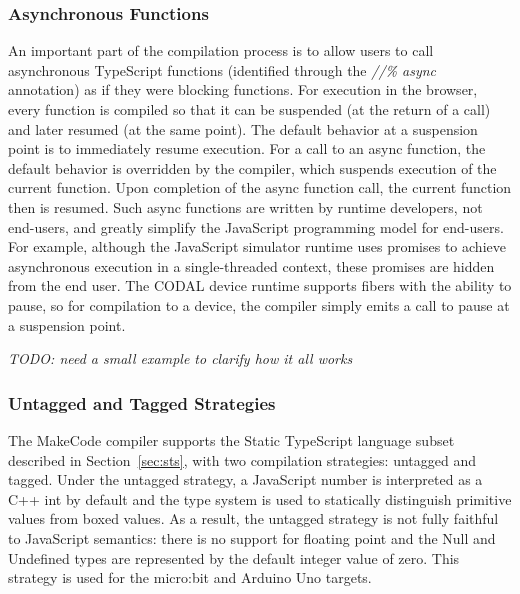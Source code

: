 \subsubsection{Asynchronous Functions}

An important part of the compilation process is to allow users to call asynchronous 
TypeScript functions (identified through the \emph{//\% async} annotation) 
as if they were blocking functions.  
For execution in the browser,
every function is compiled so that it can be suspended (at the return of a call) and later resumed (at the same point). 
The default behavior at a suspension point is to immediately resume execution.  For a call to an async function,
the default behavior is overridden by the compiler, which suspends execution of the current function. 
Upon completion of the async function call, the current function then is resumed. Such async functions are written
by runtime developers, not end-users, and greatly simplify the JavaScript
programming model for end-users. For example, although the JavaScript simulator runtime uses promises to 
achieve asynchronous execution in a single-threaded context, these promises are hidden from the end user. 
The CODAL device runtime supports fibers with the ability to pause, so for compilation to a device, 
the compiler simply emits a call to pause at a suspension point. 

\emph{TODO: need a small example to clarify how it all works}


\subsubsection{Untagged and Tagged Strategies}

The MakeCode compiler supports the Static TypeScript language subset described in Section~\ref{sec:sts},
with two compilation strategies: untagged and tagged. Under the untagged strategy,
a JavaScript number is interpreted as a C++ int by default and the type system is used
to statically distinguish primitive values from boxed values. As a result, the untagged
strategy is not fully faithful to JavaScript semantics: there is no support for floating
point and the Null and Undefined types are represented by the default integer value of zero.
This strategy is used for the micro:bit and Arduino Uno targets. 

